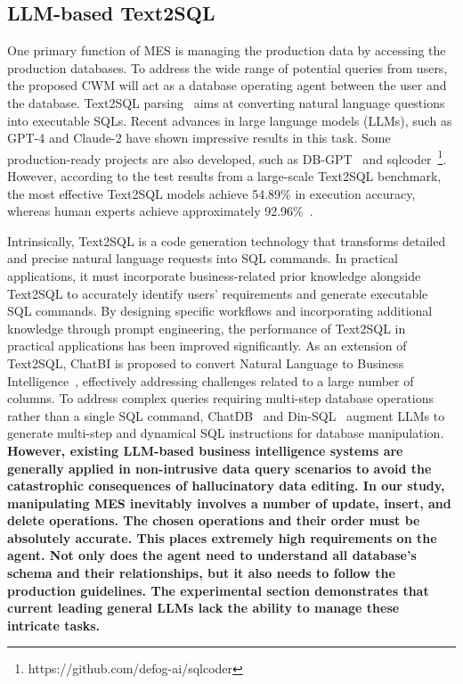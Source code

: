 \documentclass[preprint,12pt]{elsarticle}
\begin{document}
\subsection{LLM-based Text2SQL}
One primary function of MES is managing the production data by accessing the production databases. 
To address the wide range of potential queries from users, the proposed CWM will act as a database operating agent between the user and the database. 
Text2SQL parsing~\cite{li2024codes} aims at converting natural language questions into executable SQLs. 
Recent advances in large language models (LLMs), such as GPT-4 and Claude-2 have shown impressive results in this task. Some production-ready projects are also developed, such as DB-GPT~\cite{xue2023dbgpt} and sqlcoder~\footnote{https://github.com/defog-ai/sqlcoder}.
However, according to the test results from a large-scale Text2SQL benchmark, the most effective Text2SQL models achieve 54.89\% in execution accuracy, whereas human experts achieve approximately 92.96\%~\cite{li2024can}. 

Intrinsically, Text2SQL is a code generation technology that transforms detailed and precise natural language requests into SQL commands. 
In practical applications, it must incorporate business-related prior knowledge alongside Text2SQL to accurately identify users' requirements and generate executable SQL commands.
By designing specific workflows and incorporating additional knowledge through prompt engineering, the performance of Text2SQL in practical applications has been improved significantly. 
As an extension of Text2SQL, ChatBI is proposed to convert Natural Language to Business Intelligence~\cite{lian2024chatbi}, effectively addressing challenges related to a large number of columns. 
To address complex queries requiring multi-step database operations rather than a single SQL command, ChatDB~\cite{hu2023chatdb} and Din-SQL~\cite{pourreza2024din} augment LLMs to generate multi-step and dynamical SQL instructions for database manipulation. 
\textbf{However, existing LLM-based business intelligence systems are generally applied in non-intrusive data query scenarios to avoid the catastrophic consequences of hallucinatory data editing.
In our study, manipulating MES inevitably involves a number of update, insert, and delete operations. 
The chosen operations and their order must be absolutely accurate. 
This places extremely high requirements on the agent. 
Not only does the agent need to understand all database's schema and their relationships, but it also needs to follow the production guidelines.
The experimental section demonstrates that current leading general LLMs lack the ability to manage these intricate tasks.}
\end{document}

